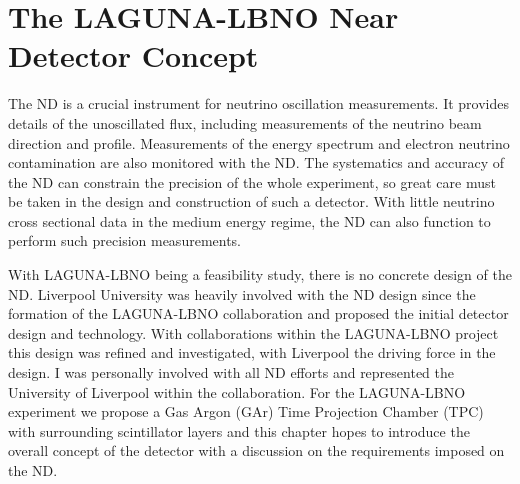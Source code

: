 \chapter{The LAGUNA-LBNO Near Detector Concept}
The ND is a crucial instrument for neutrino oscillation measurements. It provides details of the unoscillated flux, including measurements of the neutrino beam direction and profile. Measurements of the energy spectrum and electron neutrino contamination are also monitored with the ND. The systematics and accuracy of the ND can constrain the precision of the whole experiment, so great care must be taken in the design and construction of such a detector. With little neutrino cross sectional data in the medium energy regime, the ND can also function to perform such precision measurements. 

With LAGUNA-LBNO being a feasibility study, there is no concrete design of the ND. Liverpool University was heavily involved with the ND design since the formation of the LAGUNA-LBNO collaboration and proposed the initial detector design and technology. With collaborations within the LAGUNA-LBNO project this design was refined and investigated, with Liverpool the driving force in the design. I was personally involved with all ND efforts and represented the University of Liverpool within the collaboration. For the LAGUNA-LBNO experiment we propose a Gas Argon (GAr) Time Projection Chamber (TPC) with surrounding scintillator layers and this chapter hopes to introduce the overall concept of the detector with a discussion on the requirements imposed on the ND. 

\vspace{5mm}
